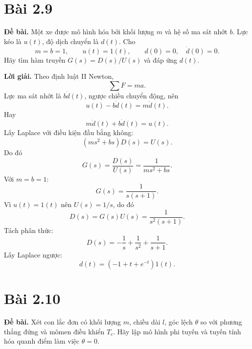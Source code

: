 \documentclass[11pt,a4paper]{article}
\newcommand{\baitap}[1]{%
  \Needspace{4\baselineskip}%
  \section*{Bài #1}%
}
\newcommand{\debai}{\par\noindent\textbf{Đề bài.}\enspace}
\newcommand{\loigiai}{\par\smallskip\noindent\textbf{Lời giải.}\enspace}
\begin{document}
\baitap{2.9}
\debai
Một xe được mô hình hóa bởi khối lượng $m$ và hệ số ma sát nhớt $b$. Lực kéo là $u(t)$, độ dịch chuyển là $d(t)$. Cho
\[
m=b=1,\qquad u(t)=1(t),\qquad d(0)=0,\quad \dot d(0)=0.
\]
Hãy tìm hàm truyền $G(s)=D(s)/U(s)$ và đáp ứng $d(t)$.

\loigiai
Theo định luật II Newton,
\[
\sum F=ma.
\]
Lực ma sát nhớt là $b\dot d(t)$, ngược chiều chuyển động, nên
\[
u(t)-b\dot d(t)=m\ddot d(t).
\]
Hay
\[
m\ddot d(t)+b\dot d(t)=u(t).
\]
Lấy Laplace với điều kiện đầu bằng không:
\[
(ms^2+bs)D(s)=U(s).
\]
Do đó
\[
\boxed{G(s)=\frac{D(s)}{U(s)}=\frac{1}{ms^2+bs}}.
\]
Với $m=b=1$:
\[
G(s)=\frac{1}{s(s+1)}.
\]
Vì $u(t)=1(t)$ nên $U(s)=1/s$, do đó
\[
D(s)=G(s)U(s)=\frac{1}{s^2(s+1)}.
\]
Tách phân thức:
\[
D(s)=-\frac1s+\frac1{s^2}+\frac1{s+1}.
\]
Lấy Laplace ngược:
\[
\boxed{d(t)=\left(-1+t+e^{-t}\right)1(t)}.
\]

\baitap{2.10}
\debai
Xét con lắc đơn có khối lượng $m$, chiều dài $l$, góc lệch $\theta$ so với phương thẳng đứng và mômen điều khiển $T_c$. Hãy lập mô hình phi tuyến và tuyến tính hóa quanh điểm làm việc $\theta=0$.

\begin{center}
\end{center}
\end{document}
